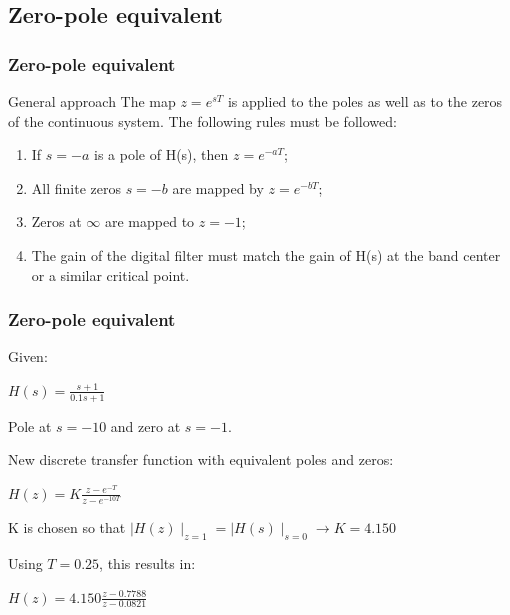 \subsection{Zero-pole equivalent}

\begin{frame}
	\frametitle{Zero-pole equivalent}
	\begin{block}{General approach}
		The map $z = e^{sT}$ is applied to the poles as well as to the zeros of the continuous system. The following rules must be followed:
		\begin{enumerate}
			\item If $s=-a$ is a pole of H(s), then $z=e^{-aT}$;
			\item All finite zeros $s=-b$ are mapped by $z = e^{-bT}$;
			\item Zeros at $\infty$ are mapped to $z = -1$;
			\item The gain of the digital filter must match the gain of H(s) at the band center or a similar critical point.
		\end{enumerate}
	\end{block}
\end{frame}

\begin{frame}
	\frametitle{Zero-pole equivalent}
	\begin{example}
		Given:
		\begin{center}
			$H(s) = \frac{s + 1}{0.1s + 1}$
		\end{center}
		Pole at $s=-10$ and zero at $s=-1$.
		
		New discrete transfer function with equivalent poles and zeros:
		\begin{center}
			$H(z) = K \frac{z - e^{-T}}{z - e^{-10T}}$
		\end{center}
		K is chosen so that $\mid H(z)\mid _{z=1} = \mid H(s) \mid _{s=0} \to K=4.150$

		Using $T=0.25$, this results in:
		\begin{center}
			$H(z) = 4.150 \frac{z-0.7788}{z-0.0821}$
		\end{center}
	\end{example}
\end{frame}


